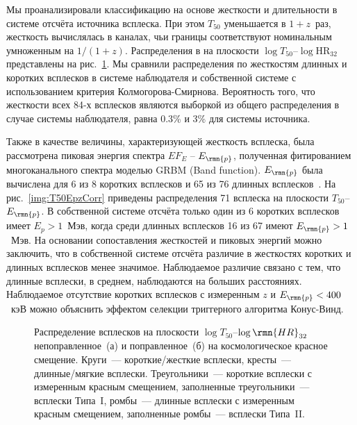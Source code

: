 Мы проанализировали классификацию на основе жесткости и длительности в системе 
отсчёта источника всплеска. При этом $T_{50}$ уменьшается в $1+z$~раз, жесткость 
вычислялась в каналах, чьи границы соответствуют номинальным умноженным на $1/(1+z)$. 
Распределения в на плоскости $\log T_{50}$--$\log \mbox{HR}_{32}$ представлены на 
рис.~\ref{img:T50HRzCorr}.  Мы сравнили распределения по жесткостям длинных и 
коротких всплесков в системе наблюдателя и собственной системе с использованием 
критерия Колмогорова-Смирнова. Вероятность того, что жесткости всех 84-х всплесков 
являются выборкой из общего распределения в случае системы наблюдателя, 
равна 0.3\% и 3\% для системы источника.  

Также в качестве величины, характеризующей жесткость всплеска, была рассмотрена 
пиковая энергия спектра $E F_E$ -- $E_{\rmn{p}}$, полученная фитированием многоканального 
спектра моделью GRBM (Band function). $E_{\rmn{p}}$ была вычислена для 6 из 8 коротких 
всплесков и 65 из 76 длинных всплесков~\citep{Tsvetkova_KW_GRBs_with_z}. На рис.~\ref{img:T50EpzCorr} 
приведены распределения 71 всплеска на плоскости $T_{50}$--$E_{\rmn{p}}$. В собственной системе 
отсчёта только один из 6 коротких всплесков имеет $E_p > 1$~Мэв, когда среди длинных 
всплесков 16 из 67 имеют $E_{\rmn{p}} > 1$~Мэв. На основании сопоставления жесткостей 
и пиковых энергий можно заключить, что в собственной системе отсчёта 
различие в жесткостях коротких и длинных всплесков менее значимое. Наблюдаемое 
различие связано с тем, что длинные всплески, в среднем, наблюдаются на больших 
расстояниях. Наблюдаемое отсутствие коротких всплесков с измеренным $z$ 
и $E_{\rmn{p}} <400$~кэВ можно объяснить эффектом селекции триггерного алгоритма Конус-Винд. 

\begin{figure}[h]
  \begin{minipage}[h]{0.5\textwidth}
  \end{minipage}
  \hfill
  \begin{minipage}[h]{0.5\textwidth}
  \end{minipage}
  \caption{Распределение всплесков на плоскости $\log T_{50}$--$\log \rmn{HR}_{32}$ 
  непоправленное~(а) и поправленное~(б) на космологическое красное смещение. 
  Круги~--- короткие/жесткие всплески, кресты~--- длинные/мягкие всплески. 
  Треугольники~--- короткие всплески с измеренным красным смещением, 
  заполненные треугольники~--- всплески Типа~I, ромбы~--- длинные всплески с 
  измеренным красным смещением, заполненные ромбы~--- всплески Типа~II.}
  \label{img:T50HRzCorr}  
\end{figure}


